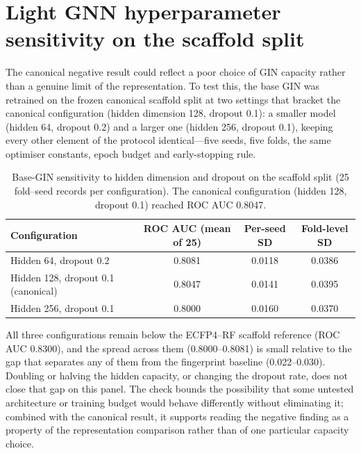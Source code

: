 \documentclass[11pt,a4paper]{article}
\begin{document}
\section{Light GNN hyperparameter sensitivity on the scaffold split}
\label{sec:gnn_sensitivity_si}

The canonical negative result could reflect a poor choice of GIN capacity rather than a genuine limit of the representation. To test this, the base GIN was retrained on the frozen canonical scaffold split at two settings that bracket the canonical configuration (hidden dimension \num{128}, dropout \num{0.1}): a smaller model (hidden \num{64}, dropout \num{0.2}) and a larger one (hidden \num{256}, dropout \num{0.1}), keeping every other element of the protocol identical---five seeds, five folds, the same optimiser constants, epoch budget and early-stopping rule.

\begin{table}[h]
\centering
\caption{Base-GIN sensitivity to hidden dimension and dropout on the scaffold split (\num{25} fold--seed records per configuration). The canonical configuration (hidden \num{128}, dropout \num{0.1}) reached ROC AUC \num{0.8047}.}
\label{tab:s3_gin_sensitivity}
\begin{tabular}{lccc}
\toprule
Configuration & ROC AUC (mean of \num{25}) & Per-seed SD & Fold-level SD \\
\midrule
Hidden \num{64}, dropout \num{0.2} & \num{0.8081} & \num{0.0118} & \num{0.0386} \\
Hidden \num{128}, dropout \num{0.1} (canonical) & \num{0.8047} & \num{0.0141} & \num{0.0395} \\
Hidden \num{256}, dropout \num{0.1} & \num{0.8000} & \num{0.0160} & \num{0.0370} \\
\bottomrule
\end{tabular}
\end{table}

All three configurations remain below the ECFP4--RF \citep{ecfp_2010} scaffold reference (ROC AUC \num{0.8300}), and the spread across them (\num{0.8000}--\num{0.8081}) is small relative to the gap that separates any of them from the fingerprint baseline (\num{0.022}--\num{0.030}). Doubling or halving the hidden capacity, or changing the dropout rate, does not close that gap on this panel. The check bounds the possibility that some untested architecture or training budget would behave differently without eliminating it; combined with the canonical result, it supports reading the negative finding as a property of the representation comparison rather than of one particular capacity choice.
\end{document}

